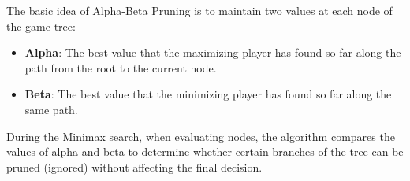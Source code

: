 \documentclass{article}
\begin{document}
The basic idea of Alpha-Beta Pruning is to maintain two values at each node of the game tree:

\begin{itemize}
    \item \textbf{Alpha}: The best value that the maximizing player has found so far along the path from the root to the current node.
    \item \textbf{Beta}: The best value that the minimizing player has found so far along the same path.
\end{itemize}

During the Minimax search, when evaluating nodes, the algorithm compares the values of alpha and beta to determine whether certain branches of the tree can be pruned (ignored) without affecting the final decision.
\end{document}
